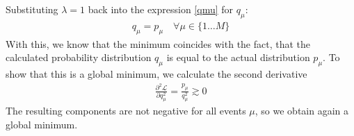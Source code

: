 \documentclass{article}
\begin{document}
    Substituting $\lambda = 1$ back into the expression \eqref{qmu} for $q_\mu$:
    \begin{align}
        q_\mu = p_\mu \quad \forall \mu \in \{1 \dots M\}
    \end{align}
    With this, we know that the minimum coincides with the fact, that the calculated probability distribution ${q_\mu}$ is equal to the actual distribution ${p_\mu}$.
    To show that this is a global minimum, we calculate the second derivative
    \begin{align}
        \frac{\partial^2 \mathcal{L}}{\partial q_\mu^2} = \frac{p_\mu}{q_\mu^2} \gtrsim 0
    \end{align}
    The resulting components are not negative for all events $\mu$, so we obtain again a global minimum.
\end{document}
